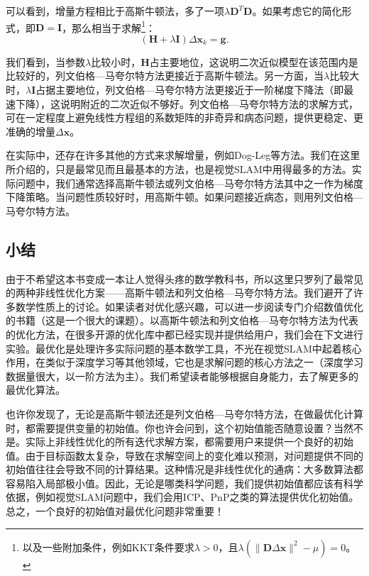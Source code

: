 可以看到，增量方程相比于高斯牛顿法，多了一项$\lambda \bm{D}^T \bm{D}$。如果考虑它的简化形式，即$\bm{D}=\bm{I}$，那么相当于求解\footnote{以及一些附加条件，例如KKT条件要求$\lambda>0$，且$\lambda(\|\bm{D} \Delta\bm{x}\|^2-\mu)=0$。}：
\begin{displaymath}
\left( \bm{H} +\lambda \bm{I} \right) \Delta \bm{x}_k = \bm{g}.
\end{displaymath}

我们看到，当参数$\lambda$比较小时，$\bm{H}$占主要地位，这说明二次近似模型在该范围内是比较好的，列文伯格—马夸尔特方法更接近于高斯牛顿法。另一方面，当$\lambda$比较大时，$\lambda \bm{I}$占据主要地位，列文伯格—马夸尔特方法更接近于一阶梯度下降法（即最速下降），这说明附近的二次近似不够好。列文伯格—马夸尔特方法的求解方式，可在一定程度上避免线性方程组的系数矩阵的非奇异和病态问题，提供更稳定、更准确的增量$\Delta \bm{x}$。

在实际中，还存在许多其他的方式来求解增量，例如Dog-Leg\cite{Nocedal2006}等方法。我们在这里所介绍的，只是最常见而且最基本的方法，也是视觉SLAM中用得最多的方法。实际问题中，我们通常选择高斯牛顿法或列文伯格—马夸尔特方法其中之一作为梯度下降策略。当问题性质较好时，用高斯牛顿。如果问题接近病态，则用列文伯格—马夸尔特方法。

\subsection{小结}
由于不希望这本书变成一本让人觉得头疼的数学教科书，所以这里只罗列了最常见的两种非线性优化方案——高斯牛顿法和列文伯格—马夸尔特方法。我们避开了许多数学性质上的讨论。如果读者对优化感兴趣，可以进一步阅读专门介绍数值优化的书籍（这是一个很大的课题）\cite{Nocedal2006}。以高斯牛顿法和列文伯格—马夸尔特方法为代表的优化方法，在很多开源的优化库中都已经实现并提供给用户，我们会在下文进行实验。最优化是处理许多实际问题的基本数学工具，不光在视觉SLAM中起着核心作用，在类似于深度学习等其他领域，它也是求解问题的核心方法之一（深度学习数据量很大，以一阶方法为主）。我们希望读者能够根据自身能力，去了解更多的最优化算法。

也许你发现了，无论是高斯牛顿法还是列文伯格—马夸尔特方法，在做最优化计算时，都需要提供变量的初始值。你也许会问到，这个初始值能否随意设置？当然不是。实际上非线性优化的所有迭代求解方案，都需要用户来提供一个良好的初始值。由于目标函数太复杂，导致在求解空间上的变化难以预测，对问题提供不同的初始值往往会导致不同的计算结果。这种情况是非线性优化的通病：大多数算法都容易陷入局部极小值。因此，无论是哪类科学问题，我们提供初始值都应该有科学依据，例如视觉SLAM问题中，我们会用ICP、PnP之类的算法提供优化初始值。总之，一个良好的初始值对最优化问题非常重要！

